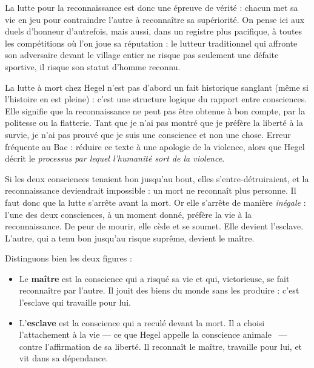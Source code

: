 \documentclass[11pt]{article}
\newcommand{\cle}[1]{{\popxbold\color{popdark}#1}}
\newcounter{popsec}
\newcounter{popsub}
\newcommand{\courssub}[1]{%
  \stepcounter{popsub}%
  \par\vspace{9pt}\noindent{\popxbold\fontsize{11.5}{13}\selectfont\color{popink}{\color{poporange}\thepopsec.\thepopsub}\hspace{6pt}#1}\par\nopagebreak\vspace{4pt}
}
\begin{document}
La lutte pour la reconnaissance est donc une épreuve de vérité : chacun met sa vie en jeu pour contraindre l'autre à reconnaître sa supériorité. On pense ici aux duels d'honneur d'autrefois, mais aussi, dans un registre plus pacifique, à toutes les compétitions où l'on \guillemotleft joue sa réputation \guillemotright : le lutteur traditionnel qui affronte son adversaire devant le village entier ne risque pas seulement une défaite sportive, il risque son statut d'homme reconnu.

\begin{attention}
La lutte à mort chez Hegel n'est pas d'abord un fait historique sanglant (même si l'histoire en est pleine) : c'est une structure logique du rapport entre consciences. Elle signifie que la reconnaissance ne peut pas être obtenue à bon compte, par la politesse ou la flatterie. Tant que je n'ai pas montré que je préfère la liberté à la survie, je n'ai pas prouvé que je suis une conscience et non une chose. Erreur fréquente au Bac : réduire ce texte à une apologie de la violence, alors que Hegel décrit le \emph{processus par lequel l'humanité sort de la violence}.
\end{attention}

\courssub{L'issue inégale : le maître et l'esclave}

Si les deux consciences tenaient bon jusqu'au bout, elles s'entre-détruiraient, et la reconnaissance deviendrait impossible : un mort ne reconnaît plus personne. Il faut donc que la lutte s'arrête avant la mort. Or elle s'arrête de manière \emph{inégale} : l'une des deux consciences, à un moment donné, préfère la vie à la reconnaissance. De peur de mourir, elle cède et se soumet. Elle devient l'\cle{esclave}. L'autre, qui a tenu bon jusqu'au risque suprême, devient le \cle{maître}.

Distinguons bien les deux figures :

\begin{itemize}
\item Le \textbf{maître} est la conscience qui a risqué sa vie et qui, victorieuse, se fait reconnaître par l'autre. Il jouit des biens du monde sans les produire : c'est l'esclave qui travaille pour lui.
\item L'\textbf{esclave} est la conscience qui a reculé devant la mort. Il a choisi l'attachement à la vie — ce que Hegel appelle la \guillemotleft conscience animale \guillemotright\ — contre l'affirmation de sa liberté. Il reconnaît le maître, travaille pour lui, et vit dans sa dépendance.
\end{itemize}
\end{document}

